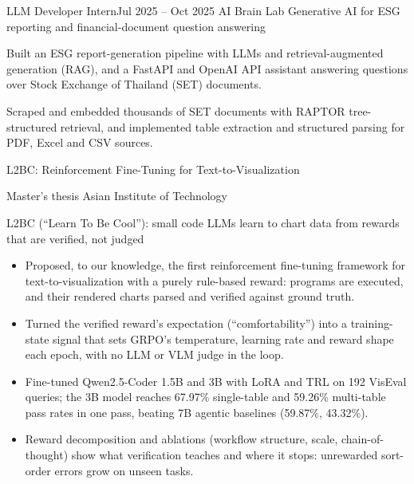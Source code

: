 \documentclass{aicv}
\begin{document}
\begin{cventry}{LLM Developer Intern}{Jul 2025 -- Oct 2025}
  {AI Brain Lab}
  {Generative AI for ESG reporting and financial-document question answering}
  \item Built an ESG report-generation pipeline with LLMs and retrieval-augmented generation (RAG), and a FastAPI and
    OpenAI API assistant answering questions over Stock Exchange of Thailand (SET) documents.
  \item Scraped and embedded thousands of SET documents with RAPTOR tree-structured retrieval, and implemented table
    extraction and structured parsing for PDF, Excel and CSV sources.
\end{cventry}


\begin{cvskills}
\end{cvskills}
\vspace{1.5pt}

\begin{cvcard}
  {\cventrytitlefont L2BC: Reinforcement Fine-Tuning for Text-to-Visualization\par}
  {\cvorgfont Master's thesis \textperiodcentered{} Asian Institute of Technology}\hfill{}\par
  {\cvcontextfont L2BC (``Learn To Be Cool''): small code LLMs learn to chart data from rewards that are verified, not judged}\par
  \begin{itemize}
    \item Proposed, to our knowledge, the first reinforcement fine-tuning framework for text-to-visualization with a purely
      rule-based reward: programs are executed, and their rendered charts parsed and verified against ground truth.
    \item Turned the verified reward's expectation (``comfortability'') into a training-state signal that sets GRPO's
      temperature, learning rate and reward shape each epoch, with no LLM or VLM judge in the loop.
    \item Fine-tuned Qwen2.5-Coder 1.5B and 3B with LoRA and TRL on 192 VisEval queries; the 3B model reaches 67.97\%
      single-table and 59.26\% multi-table pass rates in one pass, beating 7B agentic baselines (59.87\%, 43.32\%).
    \item Reward decomposition and ablations (workflow structure, scale, chain-of-thought) show what verification teaches
      and where it stops: unrewarded sort-order errors grow on unseen tasks.
  \end{itemize}
  \vspace{2.5pt}
\end{cvcard}
\end{document}
